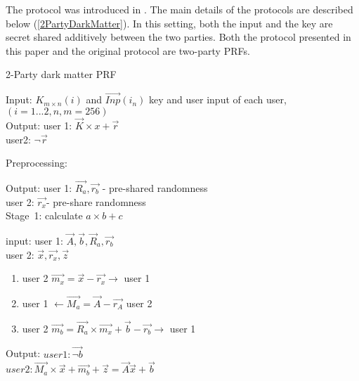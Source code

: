 The protocol was introduced in \cite{darkmatter}. The main details of the protocols are described below (\ref{2PartyDarkMatter}). In this setting, both the input and the key are secret shared additively between the two parties. Both the protocol presented in this paper and the original protocol are two-party PRFs.




\begin{algorithm}
\caption{2-Party dark matter PRF}
\label{2PartyDarkMatter}


	Input: ${K_{m\times n} }(i)$ and $\vec{Inp}(i_n)$ key and user input of each user,\\
	$(i = 1...2, n,m = 256)$\\ 
	Output: user 1: $\vec{K} \times x + \vec{r}$\\
	user2: $\neg \vec{r}$\\   %
	
		\begin{algorithmic}
			
\STATE Preprocessing:

		Output: 	user 1: $\vec{R_a}, \vec{r_b}$ - pre-shared randomness \\
						 user 2: $\vec{r_x} $- pre-share randomness \\

\STATE Stage\ 1: calculate $a \times b \plus c$

	input: user 1: ${\vec{A}, \vec{b}, {\vec R_a}, \vec{r_b} } $ \\
			  user 2: ${\vec{x}, \vec{r_x},  \vec{z} }$ \\

	  \begin{enumerate}
	
	\item user 2 $\vec{m_x} = \vec{x} -\vec{r_x}  \rightarrow  $  user 1
	
	\item user 1  $ \leftarrow   \vec{M_a} =  \vec{A} - \vec{r_A}   $ user 2
	
	\item user 2 $ \vec{m_b} = \vec{R_a} \times \vec{m_x} + \vec{b}  - \vec{r_b}  \rightarrow $ user 1
\end{enumerate}

	Output: $user 1: \vec{\neg b} $  \\
                 $user 2: \vec{M_a} \times \vec{x} + \vec{m_b} + \vec{z} = \vec{A} \vec{x} + \vec{b}$ \\


\end{algorithmic}
\end{algorithm}
